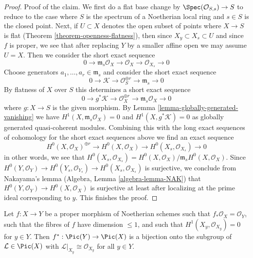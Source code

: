 \begin{proof}
\medskip\noindent
Proof of the claim. We first do a flat base change by
$\Spec(\mathcal{O}_{S, s}) \to S$ to reduce to the case
where $S$ is the spectrum of a Noetherian local ring and
$s \in S$ is the closed point. Next, if $U \subset X$
denotes the open subset of points where $X \to S$ is flat
(Theorem \ref{theorem-openness-flatness}),
then since $X_y \subset X_s \subset U$ and since $f$ is proper, we
see that after replacing $Y$ by a smaller affine open we may
assume $U = X$. Then we consider the short
exact sequence
$$
0 \to \mathfrak m_s\mathcal{O}_X \to \mathcal{O}_X \to \mathcal{O}_{X_s} \to 0
$$
Choose generators $a_1, \ldots, a_r \in \mathfrak m_s$ and consider
the short exact sequence
$$
0 \to \mathcal{K} \to \mathcal{O}_S^{\oplus r} \to \mathfrak m_s \to 0
$$
By flatness of $X$ over $S$ this determines a short exact sequence
$$
0 \to g^*\mathcal{K} \to \mathcal{O}_X^{\oplus r} \to
\mathfrak m_s\mathcal{O}_X \to 0
$$
where $g : X \to S$ is the given morphism.
By Lemma \ref{lemma-globally-generated-vanishing}
we have $H^1(X, \mathfrak m_s\mathcal{O}_X) = 0$ and
$H^1(X, g^*\mathcal{K}) = 0$ as globally generated
quasi-coherent modules. Combining this with the
long exact sequences of cohomology for the short exact
sequences above we find an exact sequence
$$
H^0(X, \mathcal{O}_X)^{\oplus r} \to
H^0(X, \mathcal{O}_X) \to
H^0(X_s, \mathcal{O}_{X_s}) \to 0
$$
in other words, we see that $H^0(X_s, \mathcal{O}_{X_s}) =
H^0(X, \mathcal{O}_X)/\mathfrak m_s H^0(X, \mathcal{O}_X)$.
Since $H^0(Y, \mathcal{O}_Y) \to H^0(Y_s, \mathcal{O}_{Y_s}) \to
H^0(X_s, \mathcal{O}_{X_s})$
is surjective, we conclude from Nakayama's lemma
(Algebra, Lemma \ref{algebra-lemma-NAK}) that
$H^0(Y, \mathcal{O}_Y) \to H^0(X, \mathcal{O}_X)$ is surjective
at least after localizing at the prime ideal corresponding to $y$.
This finishes the proof.
\end{proof}

\begin{lemma}
\label{lemma-bijection-on-Pic}
Let $f : X \to Y$ be a proper morphism of Noetherian schemes
such that $f_*\mathcal{O}_X = \mathcal{O}_Y$, such that
the fibres of $f$ have dimension $\leq 1$, and such that
$H^1(X_y, \mathcal{O}_{X_y}) = 0$ for $y \in Y$.
Then $f^* : \Pic(Y) \to \Pic(X)$ is a bijection onto
the subgroup of $\mathcal{L} \in \Pic(X)$ with
$\mathcal{L}|_{X_y} \cong \mathcal{O}_{X_y}$
for all $y \in Y$.
\end{lemma}

